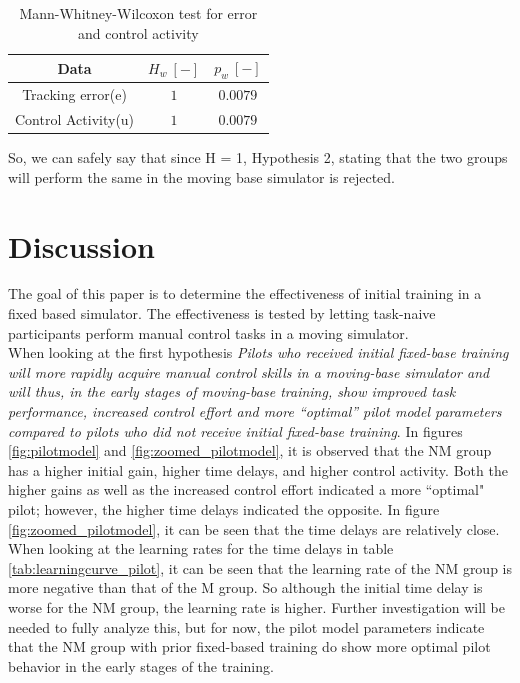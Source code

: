\documentclass[conference]{IEEEtran}
\begin{document}
\begin{table}[!h]
    \centering
    \caption{Mann-Whitney-Wilcoxon test for error and control activity}
    \begin{tabular}{c|c|c}
    Data & $H_w\ [-]$ & $p_w\ [-]$ \\
    \hline
    \hline
    Tracking error(e) & $1$ & $0.0079$\\
    Control Activity(u) & $1$ & $0.0079$ \\
    \end{tabular}
    \label{tab:MWUtest}
\end{table}

So, we can safely say that since H = 1, Hypothesis 2, stating that the two groups will perform the same in the moving base simulator is rejected.

\section{Discussion} 
The goal of this paper is to determine the effectiveness of initial training in a fixed based simulator. The effectiveness is tested by letting task-naive participants perform manual control tasks in a moving simulator.\\

When looking at the first hypothesis \textit{Pilots who received initial fixed-base training will more rapidly acquire manual control skills in a moving-base simulator and will thus, in the early stages of moving-base training, show improved task performance, increased control effort and more “optimal” pilot model parameters compared to pilots who did not receive initial fixed-base training}. In figures \ref{fig:pilotmodel} and \ref{fig:zoomed_pilotmodel}, it is observed that the NM group has a higher initial gain, higher time delays, and higher control activity. Both the higher gains as well as the increased control effort indicated a more ``optimal" pilot; however, the higher time delays indicated the opposite. In figure \ref{fig:zoomed_pilotmodel}, it can be seen that the time delays are relatively close. When looking at the learning rates for the time delays in table \ref{tab:learningcurve_pilot}, it can be seen that the learning rate of the NM group is more negative than that of the M group. So although the initial time delay is worse for the NM group, the learning rate is higher. Further investigation will be needed to fully analyze this, but for now, the pilot model parameters indicate that the NM group with prior fixed-based training do show more optimal pilot behavior in the early stages of the training. \\
\end{document}
